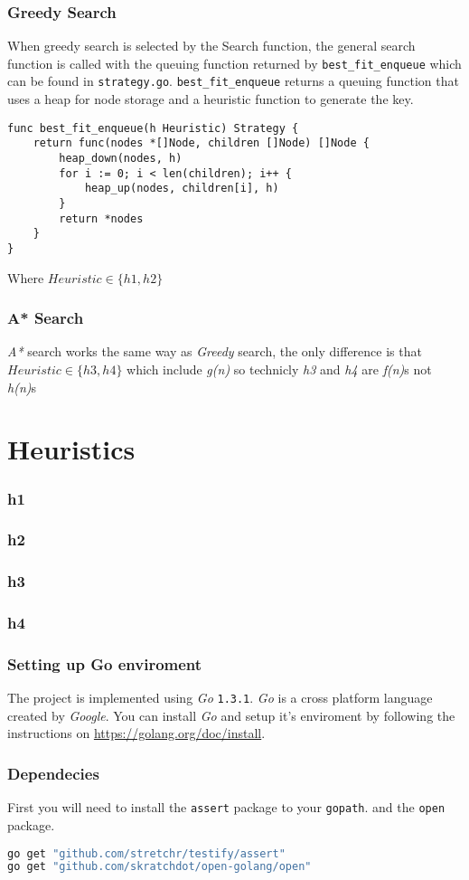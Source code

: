 \documentclass[14pt,a4paper]{report}
\begin{document}
\section{Greedy Search}
When greedy search is selected by the Search function, the general search function is called
with the queuing function returned by \verb+best_fit_enqueue+ which can be found in 
\verb+strategy.go+. \verb+best_fit_enqueue+ returns a queuing function that uses a heap for node 
storage and a heuristic function to generate the key.
\begin{lstlisting}
func best_fit_enqueue(h Heuristic) Strategy {
    return func(nodes *[]Node, children []Node) []Node {
        heap_down(nodes, h)
        for i := 0; i < len(children); i++ {
            heap_up(nodes, children[i], h)
        }
        return *nodes
    }
}
\end{lstlisting}

Where $Heuristic \in \{h1, h2\}$ 

\section{A* Search}
\emph{A*} search works the same way as \emph{Greedy} search, the only difference is that
$Heuristic \in \{h3, h4\}$ which include \emph{g(n)} so technicly \emph{h3} and \emph{h4} are 
\emph{f(n)}s not \emph{h(n)}s 
\part{Heuristics}
\section{h1}
\section{h2}
\section{h3}
\section{h4}


\appendix
\appendixpage
\addappheadtotoc
\section{Setting up Go enviroment}
The project is implemented using \emph{Go} \verb+1.3.1+. \emph{Go} is a cross platform 
language created by \emph{Google}. You can install \emph{Go} and setup it's enviroment
by following the instructions on \url{https://golang.org/doc/install}.
\section{Dependecies}
First you will need to install the \verb+assert+ package to your \verb+gopath+.
and the \verb+open+ package.
\begin{lstlisting}[language=bash]
go get "github.com/stretchr/testify/assert"
go get "github.com/skratchdot/open-golang/open"
\end{lstlisting}
\end{document}
